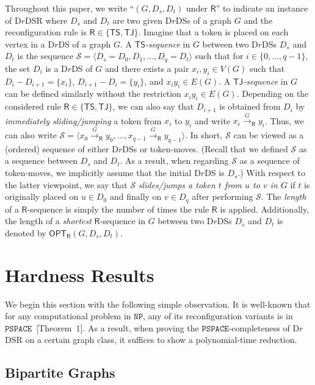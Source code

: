 \documentclass[a4paper]{article}
\theoremstyle{plain}
\theoremstyle{definition}
\newcommand{\sfTS}{{\mathsf{TS}}} %
\newcommand{\sfTJ}{{\mathsf{TJ}}} %
\newcommand{\sfR}{{\mathsf{R}}} %
\newcommand{\ttPSPACE}{{\mathtt{PSPACE}}}
\newcommand{\ttNP}{{\mathtt{NP}}}
\newcommand{\opt}{\mathsf{OPT}} %
\newcommand{\reconf}[2][\sfR]{\overset{#2}{\longrightarrow}_{#1}} %
\begin{document}
Throughout this paper, we write ``$(G, D_s, D_t)$ under $\sfR$'' to indicate an instance of \textsc{D$r$DSR} where $D_s$ and $D_t$ are two given D$r$DSs of a graph $G$ and the reconfiguration rule is $\sfR \in \{\sfTS, \sfTJ\}$.
Imagine that a token is placed on each vertex in a D$r$DS of a graph $G$. 
A \textit{$\sfTS$-sequence} in $G$ between two D$r$DSs $D_s$ and $D_t$ is the sequence $\mathcal{S} = \langle D_s = D_0, D_1, \dots, D_q = D_t \rangle$ such that for $i \in \{0, \dots, q-1\}$, the set $D_i$ is a D$r$DS of $G$ and there exists a pair $x_i, y_i \in V(G)$ such that $D_i - D_{i+1} = \{x_i\}$, $D_{i+1} - D_i = \{y_i\}$, and $x_iy_i \in E(G)$.
A \textit{$\sfTJ$-sequence} in $G$ can be defined similarly without the restriction $x_iy_i \in E(G)$.
Depending on the considered rule $\sfR \in \{\sfTS, \sfTJ\}$, we can also say that $D_{i+1}$ is obtained from $D_i$ by \textit{immediately sliding/jumping} a token from $x_i$ to $y_i$ and write $x_i \reconf[\sfR]{G} y_i$.
Thus, we can also write $\mathcal{S} = \langle x_0 \reconf[\sfR]{G} y_0, \dots, x_{q-1} \reconf[\sfR]{G} y_{q-1} \rangle$.
In short, $\mathcal{S}$ can be viewed as a (ordered) sequence of either D$r$DSs or token-moves.
(Recall that we defined $\mathcal{S}$ as a sequence between $D_s$ and $D_t$. As a result, when regarding $\mathcal{S}$ as a sequence of token-moves, we implicitly assume that the initial D$r$DS is $D_s$.) 
With respect to the latter viewpoint, we say that $\mathcal{S}$ \textit{slides/jumps a token $t$ from $u$ to $v$ in $G$} if $t$ is originally placed on $u \in D_0$ and finally on $v \in D_q$ after performing $\mathcal{S}$. 
The \textit{length} of a $\sfR$-sequence is simply the number of times the rule $\sfR$ is applied.
Additionally, the length of a \textit{shortest} $\sfR$-sequence in $G$ between two D$r$DSs $D_s$ and $D_t$ is denoted by $\opt_{\sfR}(G, D_s, D_t)$.


\section{Hardness Results}
\label{sec:hardness}

We begin this section with the following simple observation.
It is well-known that for any computational problem in $\ttNP$, any of its reconfiguration variants is in $\ttPSPACE$~\cite{ItoDHPSUU11}[Theorem~1]. 
As a result, when proving the $\ttPSPACE$-completeness of \textsc{D$r$DSR} on a certain graph class, it suffices to show a polynomial-time reduction.

\subsection{Bipartite Graphs}
\label{sec:bipartite}
\end{document}
